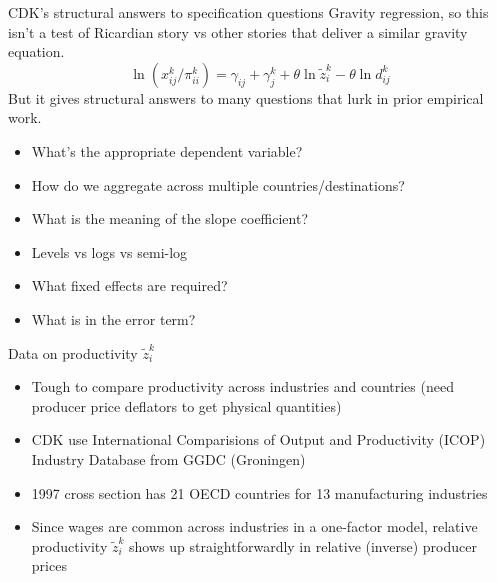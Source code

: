 \documentclass[11pt,notes=hide,aspectratio=169]{beamer}
\begin{document}
\begin{frame}{CDK's structural answers to specification questions}
Gravity regression, so this isn't a test of Ricardian story vs other stories that deliver a similar gravity equation. 
\begin{equation*}
\ln \left({x}_{ij}^{k}/\pi_{ii}^k \right) = \gamma_{ij} + \gamma_j^k + \theta \ln \tilde{z}_{i}^{k} - \theta \ln d_{ij}^k
\end{equation*}
But it gives structural answers to many questions that lurk in prior empirical work.
\begin{itemize}
	\item What's the appropriate dependent variable?
	\item How do we aggregate across multiple countries/destinations?
	\item What is the meaning of the slope coefficient?
	\item Levels vs logs vs semi-log
	\item What fixed effects are required?
	\item What is in the error term?
\end{itemize}
\end{frame}
\begin{frame}{Data on productivity $\tilde{z}_i^k$}
\begin{itemize}
	\item Tough to compare productivity across industries and countries (need producer price deflators to get physical quantities)
	\item CDK use International Comparisions of Output and Productivity (ICOP) Industry Database from GGDC (Groningen)
	\item 1997 cross section has 21 OECD countries for 13 manufacturing industries
	\item Since wages are common across industries in a one-factor model,
	relative productivity $\tilde{z}_i^k$ shows up straightforwardly in relative (inverse) producer prices
\end{itemize}
\end{frame}
\end{document}
